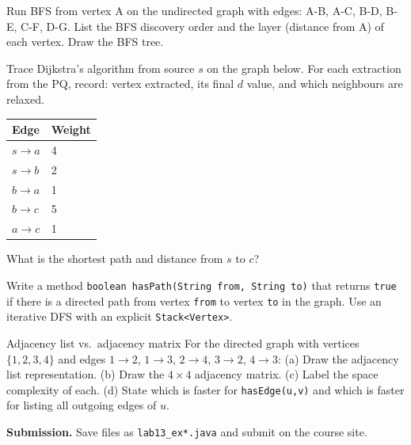 \documentclass[11pt]{article}
\begin{document}
\takehomebanner

\begin{trace}
Run BFS from vertex A on the undirected graph with edges:
A-B, A-C, B-D, B-E, C-F, D-G.
List the BFS discovery order and the layer (distance from A) of each vertex.
Draw the BFS tree.
\end{trace}

\begin{trace}
Trace Dijkstra's algorithm from source $s$ on the graph below.
For each extraction from the PQ, record: vertex extracted, its final $d$ value,
and which neighbours are relaxed.
\medskip
\begin{center}
\begin{tabular}{@{}ll@{}}
\toprule
Edge & Weight \\
\midrule
$s \to a$ & 4 \\
$s \to b$ & 2 \\
$b \to a$ & 1 \\
$b \to c$ & 5 \\
$a \to c$ & 1 \\
\bottomrule
\end{tabular}
\end{center}
What is the shortest path and distance from $s$ to $c$?
\end{trace}

\begin{writecode}
Write a method \texttt{boolean hasPath(String from, String to)} that returns \texttt{true}
if there is a directed path from vertex \texttt{from} to vertex \texttt{to} in the graph.
Use an iterative DFS with an explicit \texttt{Stack<Vertex>}.
\end{writecode}

\begin{drawex}{Adjacency list vs.\ adjacency matrix}
For the directed graph with vertices $\{1,2,3,4\}$ and edges
$1{\to}2$, $1{\to}3$, $2{\to}4$, $3{\to}2$, $4{\to}3$:
(a) Draw the adjacency list representation.
(b) Draw the $4\times 4$ adjacency matrix.
(c) Label the space complexity of each.
(d) State which is faster for \texttt{hasEdge(u,v)} and which is faster for listing all outgoing edges of $u$.
\end{drawex}

\vspace{4pt}
\noindent\textbf{Submission.} Save files as \texttt{lab13\_ex*.java} and submit on the course site.
\end{document}
